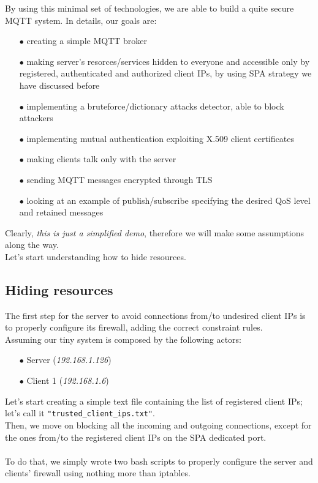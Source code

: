 \documentclass[12pt]{report}
\begin{document}
{By using this minimal set of technologies, we are able to build a quite secure MQTT system. In details, our goals are:\bigskip

\begin{itemize}
\setlength{\itemindent}{+4mm}
\item[$\bullet$] creating a simple MQTT broker
\item[$\bullet$] making server's resorces/services hidden to everyone and accessible only by registered, authenticated and authorized client IPs, by using SPA strategy we have discussed before
\item[$\bullet$] implementing a bruteforce/dictionary attacks detector, able to block attackers
\item[$\bullet$] implementing mutual authentication exploiting X.509 client certificates
\item[$\bullet$] making clients talk only with the server
\item[$\bullet$] sending MQTT messages encrypted through TLS
\item[$\bullet$] looking at an example of publish/subscribe specifying the desired QoS level and retained messages
\end{itemize}

Clearly, \emph{this is just a simplified demo}, therefore we will make some assumptions along the way.\\

Let's start understanding how to hide resources.

\subsection{Hiding resources}
\bigskip
The first step for the server to avoid connections from/to undesired client IPs is to properly configure its firewall, adding the correct constraint rules.\\
Assuming our tiny system is composed by the following actors:
\bigskip
\begin{itemize}
\setlength{\itemindent}{+4mm}
\item[$\bullet$] Server (\emph{192.168.1.126})
\item[$\bullet$] Client 1 (\emph{192.168.1.6})\\
\end{itemize}

Let's start creating a simple text file containing the list of registered client IPs; let's call it \texttt{"trusted\_client\_ips.txt"}.\\
Then, we move on blocking all the incoming and outgoing connections, except for the ones from/to the registered client IPs on the SPA dedicated port.\\\\
To do that, we simply wrote two bash scripts to properly configure the server and clients' firewall using nothing more than iptables.

}
\end{document}
